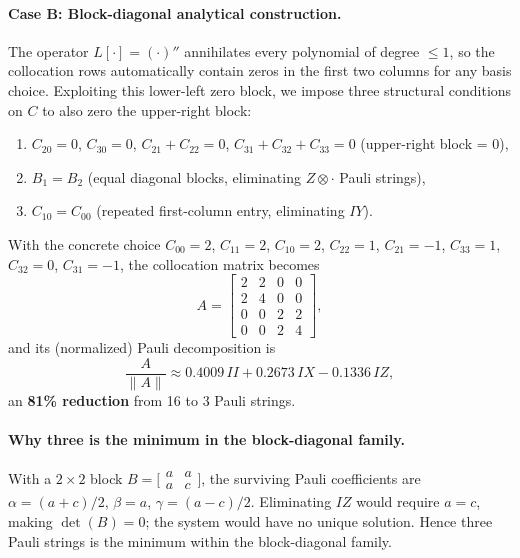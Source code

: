 \documentclass[a4paper,12pt]{amsart}
\begin{document}
\paragraph{Case B: Block-diagonal analytical construction.}
The operator $L[\cdot] = (\cdot)''$ annihilates every polynomial of degree $\leq 1$, so the collocation rows automatically contain zeros in the first two columns for any basis choice. Exploiting this lower-left zero block, we impose three structural conditions on $C$ to also zero the upper-right block:
\begin{enumerate}
    \item $C_{20}=0$, $C_{30}=0$, $C_{21}+C_{22}=0$, $C_{31}+C_{32}+C_{33}=0$ (upper-right block = 0),
    \item $B_1 = B_2$ (equal diagonal blocks, eliminating $Z \otimes \cdot$ Pauli strings),
    \item $C_{10} = C_{00}$ (repeated first-column entry, eliminating $IY$).
\end{enumerate}
With the concrete choice $C_{00}=2$, $C_{11}=2$, $C_{10}=2$, $C_{22}=1$, $C_{21}=-1$, $C_{33}=1$, $C_{32}=0$, $C_{31}=-1$, the collocation matrix becomes
\begin{equation}
A =
\begin{bmatrix}
2 & 2 & 0 & 0 \\
2 & 4 & 0 & 0 \\
0 & 0 & 2 & 2 \\
0 & 0 & 2 & 4
\end{bmatrix},
\end{equation}
and its (normalized) Pauli decomposition is
\begin{equation}
    \frac{A}{\|A\|} \approx 0.4009\,II + 0.2673\,IX - 0.1336\,IZ,
\end{equation}
an \textbf{81\% reduction} from 16 to 3 Pauli strings.

\paragraph{Why three is the minimum in the block-diagonal family.}
With a $2\times 2$ block $B = \bigl[\begin{smallmatrix}a&a\\a&c\end{smallmatrix}\bigr]$, the surviving Pauli coefficients are $\alpha=(a+c)/2$, $\beta=a$, $\gamma=(a-c)/2$. Eliminating $IZ$ would require $a=c$, making $\det(B)=0$; the system would have no unique solution. Hence three Pauli strings is the minimum within the block-diagonal family.
\end{document}
